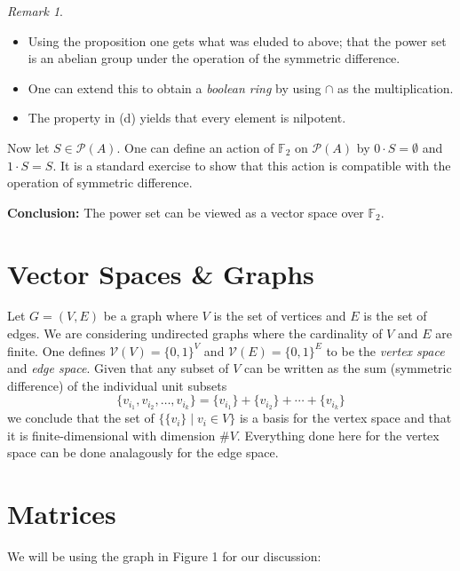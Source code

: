 \documentclass[10pt, letterpaper]{article}
\newcommand{\field}[1]{\mathbb{#1}}
\theoremstyle{remark}
\newtheorem{rem}{Remark}
\theoremstyle{definition}
\begin{document}
\begin{rem} \leavevmode
	\begin{itemize}
		\item Using the proposition one gets what was eluded to above; that the power set is an abelian group under the operation of the symmetric difference.
		\item One can extend this to obtain a \textit{boolean ring} by using $\cap$ as the multiplication.
		\item The property in (d) yields that every element is nilpotent.
	\end{itemize}
\end{rem}

Now let $S \in \mathcal{P}(A)$. One can define an action of $\field{F}_2$ on $\mathcal{P}(A)$ by $0 \cdot S = \emptyset$ and $1 \cdot S = S$. It is a standard exercise to show that this action is compatible with the operation of symmetric difference. 

\hspace*{.15in}

\textbf{Conclusion: } The power set can be viewed as a vector space over $\field{F}_2$.

\section{Vector Spaces \& Graphs}

Let $G = (V,E)$ be a graph where $V$ is the set of vertices and $E$ is the set of edges. We are considering undirected graphs where the cardinality of $V$ and $E$ are finite. One defines $\mathcal{V}(V) = \{0,1\}^V$ and $\mathcal{V}(E) = \{0,1\}^E$ to be the \textit{vertex space} and \textit{edge space}. Given that any subset of $V$ can be written as the sum (symmetric difference) of the individual unit subsets
\[
	\{v_{i_1}, v_{i_2}, \ldots, v_{i_k}\} = \{v_{i_1}\} + \{v_{i_2}\} + \cdots + \{v_{i_k}\}
\]
we conclude that the set of $\{\{v_i\} \mid v_i \in V\}$ is a basis for the vertex space and that it is finite-dimensional with dimension \#$V$. Everything done here for the vertex space can be done analagously for the edge space.


\section{Matrices}

We will be using the graph in Figure 1 for our discussion:

\vspace*{.15in}
\end{document}
